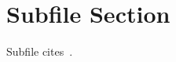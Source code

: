 \documentclass[../main.tex]{subfiles}
\begin{document}
\section{Subfile Section}\label{sec:subfile}
Subfile cites~\cite{k_sub}.
\end{document}
